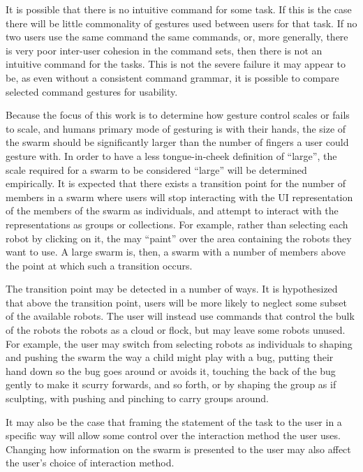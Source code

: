 \documentclass[]{article}
\begin{document}
It is possible that there is no intuitive command for some task. 
If this is the case there will be little commonality of gestures used between users for that task.
If no two users use the same command the same commands, or, more generally, there is very poor inter-user cohesion in the command sets, then there is not an intuitive command for the tasks.
This is not the severe failure it may appear to be, as even without a consistent command grammar, it is possible to compare selected command gestures for usability. 

Because the focus of this work is to determine how gesture control scales or fails to scale, and humans primary mode of gesturing is with their hands, the size of the swarm should be significantly larger than the number of fingers a user could gesture with. 
In order to have a less tongue-in-cheek definition of ``large'', the scale required for a swarm to be considered ``large'' will be determined empirically.
It is expected that there exists a transition point for the number of members in a swarm where users will stop interacting with the UI representation of the members of the swarm as individuals, and attempt to interact with the representations as groups or collections. 
For example, rather than selecting each robot by clicking on it, the may ``paint'' over the area containing the robots they want to use. 
A large swarm is, then, a swarm with a number of members above the point at which such a transition occurs. 

The transition point may be detected in a number of ways. 
It is hypothesized that above the transition point, users will be more likely to neglect some subset of the available robots. 
The user will instead use commands that control the bulk of the robots the robots as a cloud or flock, but may leave some robots unused. 
For example, the user may switch from selecting robots as individuals to shaping and pushing the swarm the way a child might play with a bug, putting their hand down so the bug goes around or avoids it, touching the back of the bug gently to make it scurry forwards, and so forth, or by shaping the group as if sculpting, with pushing and pinching to carry groups around. 

It may also be the case that framing the statement of the task to the user in a specific way will allow some control over the interaction method the user uses. 
Changing how information on the swarm is presented to the user may also affect the user's choice of interaction method. 
 
\end{document}

